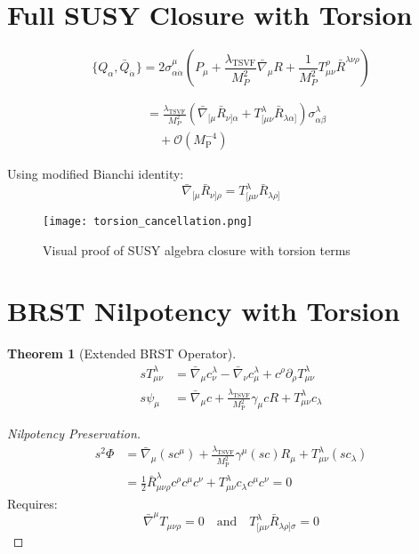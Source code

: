 \documentclass[12pt, onecolumn]{article}
\newtheorem{theorem}{Theorem}[section]
\theoremstyle{definition}
\newcommand{\tsvf}{\lambda_{\mathrm{TSVF}}}
\newcommand{\Mp}{M_{\mathrm{P}}}
\numberwithin{equation}{section}
\begin{document}
\appendix
\begin{appendices}


\section{Full SUSY Closure with Torsion}  
\label{app:torsion_closure}  

\begin{equation}  
\{Q_\alpha, \bar{Q}_{\dot{\alpha}}\} = 2\sigma^\mu_{\alpha\dot{\alpha}}\left(P_\mu + \frac{\tsvf}{M_P^2} \bar{\nabla}_\mu R + \frac{1}{M_P^2} T^\rho_{\mu\nu}\bar{R}^{\lambda\nu\rho}\right)
\end{equation}

\begin{align}  
[Q_\alpha, \{Q_\beta, A_\mu\}] &= \frac{\tsvf}{M_P^2}\left(\bar{\nabla}_{[\mu}\bar{R}_{\nu]\alpha} + T^\lambda_{[\mu\nu}\bar{R}_{\lambda\alpha]}\right)\sigma^\lambda_{\alpha\beta} \nonumber \\
&\quad + \mathcal{O}(\Mp^{-4})
\end{align}


Using modified Bianchi identity:
\begin{equation}  
\bar{\nabla}_{[\mu}\bar{R}_{\nu]\rho} = T^\lambda_{[\mu\nu}\bar{R}_{\lambda\rho]}
\end{equation}

\begin{figure}[H]
\centering
\texttt{[image: torsion\_cancellation.png]}
\caption{Visual proof of SUSY algebra closure with torsion terms}
\label{fig:torsion_cancel}
\end{figure}

\section{BRST Nilpotency with Torsion}  
\label{app:brst_torsion}  

\begin{theorem}[Extended BRST Operator]
\begin{align}
s T^\lambda_{\mu\nu} &= \bar{\nabla}_\mu c^\lambda_\nu - \bar{\nabla}_\nu c^\lambda_\mu + c^\rho\partial_\rho T^\lambda_{\mu\nu} \\
s\psi_\mu &= \bar{\nabla}_\mu c + \frac{\tsvf}{\Mp^2}\gamma_\mu cR + T^\lambda_{\mu\nu}c_\lambda
\end{align}
\end{theorem}

\begin{proof}[Nilpotency Preservation]
\begin{align}
s^2\Phi &= \bar{\nabla}_\mu(sc^\mu) + \frac{\tsvf}{\Mp^2}\gamma^\mu(sc) R_\mu + T^\lambda_{\mu\nu}(sc_\lambda) \nonumber \\
&= \frac{1}{2}\bar{R}_{\mu\nu\rho}^\lambda c^\rho c^\mu c^\nu + T^\lambda_{\mu\nu}c_\lambda c^\mu c^\nu = 0
\end{align}
Requires:
\begin{equation}
\bar{\nabla}^\mu T_{\mu\nu\rho} = 0 \quad \text{and} \quad T_{[\mu\nu}^\lambda \bar{R}_{\lambda\rho]\sigma} = 0
\end{equation}
\end{proof}


\end{appendices}
\end{document}
